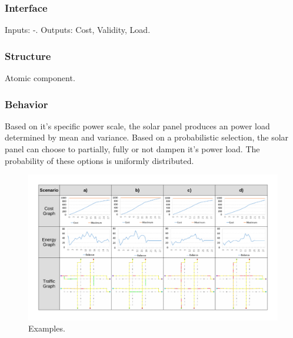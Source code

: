 \subsubsection{Interface}

Inputs: -. Outputs: Cost, Validity, Load.

\subsubsection{Structure}

Atomic component.

\subsubsection{Behavior}

Based on it's specific power scale, the solar panel produces an power load determined by mean and variance. Based on a probabilistic selection, the solar panel can choose to partially, fully or not dampen it's power load. The probability of these options is uniformly distributed.

\begin{figure}[t]
	\centering
	\includegraphics[width=\textwidth]{../gfx/examples.pdf}
		
	\caption{Examples.}
	\label{figure:examples}
\end{figure}